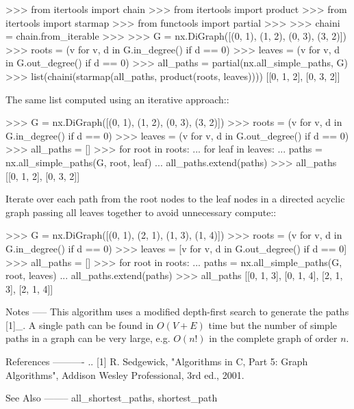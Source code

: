 \begin{DoxyVerb}
    >>> from itertools import chain
    >>> from itertools import product
    >>> from itertools import starmap
    >>> from functools import partial
    >>>
    >>> chaini = chain.from_iterable
    >>>
    >>> G = nx.DiGraph([(0, 1), (1, 2), (0, 3), (3, 2)])
    >>> roots = (v for v, d in G.in_degree() if d == 0)
    >>> leaves = (v for v, d in G.out_degree() if d == 0)
    >>> all_paths = partial(nx.all_simple_paths, G)
    >>> list(chaini(starmap(all_paths, product(roots, leaves))))
    [[0, 1, 2], [0, 3, 2]]

The same list computed using an iterative approach::

    >>> G = nx.DiGraph([(0, 1), (1, 2), (0, 3), (3, 2)])
    >>> roots = (v for v, d in G.in_degree() if d == 0)
    >>> leaves = (v for v, d in G.out_degree() if d == 0)
    >>> all_paths = []
    >>> for root in roots:
    ...     for leaf in leaves:
    ...         paths = nx.all_simple_paths(G, root, leaf)
    ...         all_paths.extend(paths)
    >>> all_paths
    [[0, 1, 2], [0, 3, 2]]

Iterate over each path from the root nodes to the leaf nodes in a
directed acyclic graph passing all leaves together to avoid unnecessary
compute::

    >>> G = nx.DiGraph([(0, 1), (2, 1), (1, 3), (1, 4)])
    >>> roots = (v for v, d in G.in_degree() if d == 0)
    >>> leaves = [v for v, d in G.out_degree() if d == 0]
    >>> all_paths = []
    >>> for root in roots:
    ...     paths = nx.all_simple_paths(G, root, leaves)
    ...     all_paths.extend(paths)
    >>> all_paths
    [[0, 1, 3], [0, 1, 4], [2, 1, 3], [2, 1, 4]]

Notes
-----
This algorithm uses a modified depth-first search to generate the
paths [1]_.  A single path can be found in $O(V+E)$ time but the
number of simple paths in a graph can be very large, e.g. $O(n!)$ in
the complete graph of order $n$.

References
----------
.. [1] R. Sedgewick, "Algorithms in C, Part 5: Graph Algorithms",
   Addison Wesley Professional, 3rd ed., 2001.

See Also
--------
all_shortest_paths, shortest_path\end{DoxyVerb}
 \mbox{\label{namespacenetworkx_1_1algorithms_1_1simple__paths_a2ed07ef1ce2ec6ff72dc537d79a436ed}} 
